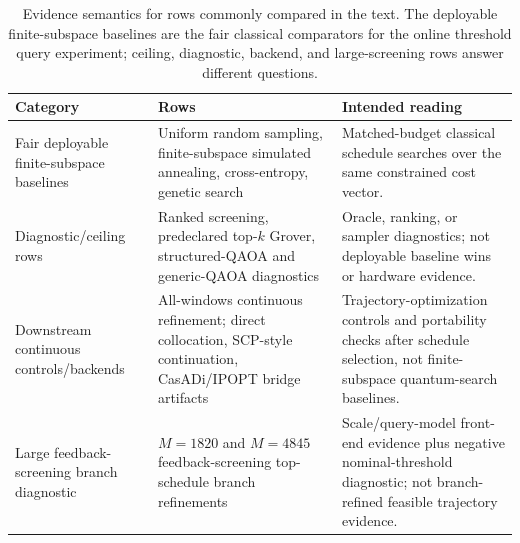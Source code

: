 \documentclass[preprint,12pt]{elsarticle}
\begin{document}
\begin{table}[t]
\centering
\caption{Evidence semantics for rows commonly compared in the text. The deployable finite-subspace baselines are the fair classical comparators for the online threshold query experiment; ceiling, diagnostic, backend, and large-screening rows answer different questions.}
\label{tab:evidence_semantics}
\small
\begin{tabular}{p{}p{}p{}}
\toprule
Category & Rows & Intended reading \\
\midrule
Fair deployable finite-subspace baselines & Uniform random sampling, finite-subspace simulated annealing, cross-entropy, genetic search & Matched-budget classical schedule searches over the same constrained cost vector. \\
Diagnostic/ceiling rows & Ranked screening, predeclared top-$k$ Grover, structured-QAOA and generic-QAOA diagnostics & Oracle, ranking, or sampler diagnostics; not deployable baseline wins or hardware evidence. \\
Downstream continuous controls/backends & All-windows continuous refinement; direct collocation, SCP-style continuation, CasADi/IPOPT bridge artifacts & Trajectory-optimization controls and portability checks after schedule selection, not finite-subspace quantum-search baselines. \\
Large feedback-screening branch diagnostic & $M=1820$ and $M=4845$ feedback-screening top-schedule branch refinements & Scale/query-model front-end evidence plus negative nominal-threshold diagnostic; not branch-refined feasible trajectory evidence. \\
\bottomrule
\end{tabular}
\end{table}

\begin{table}[t]
\centering
\caption{Online threshold feasible-subspace search. The fair matched-budget comparison is online threshold search versus uniform random sampling; \texttt{surrogate\_ranked} is an optimistic ceiling/diagnostic ranking, not a deployable baseline claim. The online protocol uses only current-incumbent threshold comparisons and does not know top-2 states. \texttt{recorded\_branch\_refined} rows use recorded branch-refined costs; \texttt{feedback\_screening} rows use CR3BP feedback-propagation screening costs only.}
\label{tab:online_quantum_search}
\resizebox{\textwidth}{!}{}
\end{table}
\end{document}
